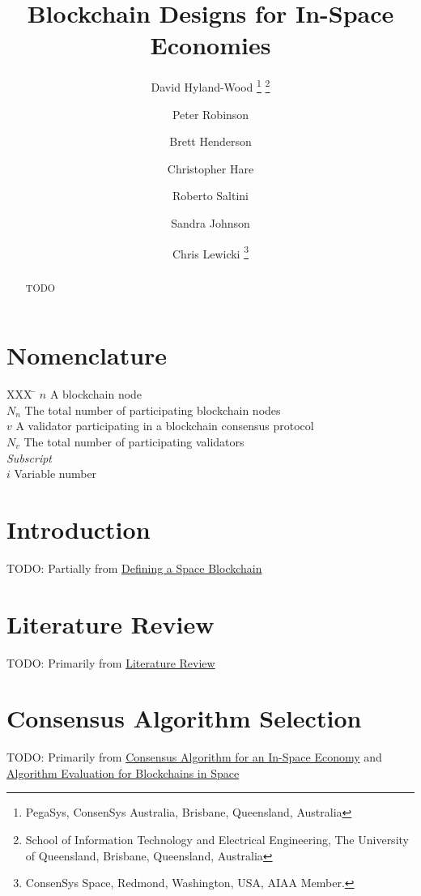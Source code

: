 \documentclass[]{aiaa-tc}%
\title{Blockchain Designs for In-Space Economies}
\author{
  David Hyland-Wood%
    \thanks{PegaSys, ConsenSys Australia, Brisbane, Queensland, Australia}
    \thanks{School of Information Technology and Electrical Engineering, The University of Queensland, Brisbane, Queensland, Australia}\\
  \and Peter Robinson\thanksibid{1} \thanksibid{2}
  \and Brett Henderson\thanksibid{1}
  \and Christopher Hare\thanksibid{1}
  \and Roberto Saltini\thanksibid{1}
  \and Sandra Johnson\thanksibid{1}
  \and
  Chris Lewicki%
   \thanks{ConsenSys Space, Redmond, Washington, USA, AIAA Member.}
 }
\begin{document}
\maketitle

\begin{abstract}
TODO
\end{abstract}

\section*{Nomenclature}

\begin{tabbing}
  XXX \= \kill%
  $n$ \> A blockchain node \\
  $N_{n}$ \> The total number of participating blockchain nodes \\
  $v$ \> A validator participating in a blockchain consensus protocol \\
  $N_{v}$ \> The total number of participating validators \\
  \textit{Subscript}\\
  $i$ \> Variable number \\
 \end{tabbing}

\section{Introduction}

TODO: Partially from \href{https://docs.google.com/document/d/1K9YtM1mFtg6TUXoUPOeFBk6uPVdNTkJD7JFjJ4v7Ing/edit}{Defining a Space Blockchain}

\section{Literature Review}

TODO: Primarily from \href{https://docs.google.com/document/d/1rU15AehftYQ6U1uiUhi44GROBVatPzkukOgTyjBBE_M/edit}{Literature Review}

\section{Consensus Algorithm Selection}

TODO: Primarily from \href{https://docs.google.com/document/d/16O1zB_lcD3egKadkRsFOPac2bynLB9gTbNVr9kFf3HA/edit}{Consensus Algorithm for an In-Space Economy} and \href{https://docs.google.com/document/d/1rzcag5pdtEJBVtK_JrG3c8htZkn-xGRbSOg5MPRNL3s/edit}{Algorithm Evaluation for Blockchains in Space}
\end{document}

